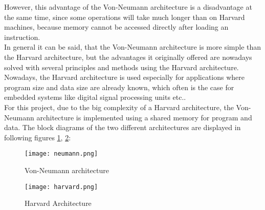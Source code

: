 However, this advantage of the Von-Neumann architecture is a disadvantage at the same time, since some operations will take much longer than on Harvard machines, because memory cannot be accessed directly after loading an instruction.\\
In general it can be said, that the Von-Neumann architecture is more simple than the Harvard architecture, but the advantages it originally offered are nowadays solved with several principles and methods using the Harvard architecture. Nowadays, the Harvard architecture is used especially for applications where program size and data size are already known, which often is the case for embedded systems like digital signal processing units etc..\\
For this project, due to the big complexity of a Harvard architecture, the Von-Neumann architecture is implemented using a shared memory for program and data. \cite{hellmann2013}
The block diagrams of the two different architectures are displayed in following figures \ref{fig:neumann}, \ref{fig:harvard}:
\begin{figure}[H]
	\centering
	\texttt{[image: neumann.png]}
	\caption{Von-Neumann architecture \cite{hellmann2013}}
	\label{fig:neumann}
\end{figure}

\begin{figure}[H]
	\centering
	\texttt{[image: harvard.png]}
	\caption{Harvard Architecture \cite{hellmann2013}}
	\label{fig:harvard}
\end{figure}


